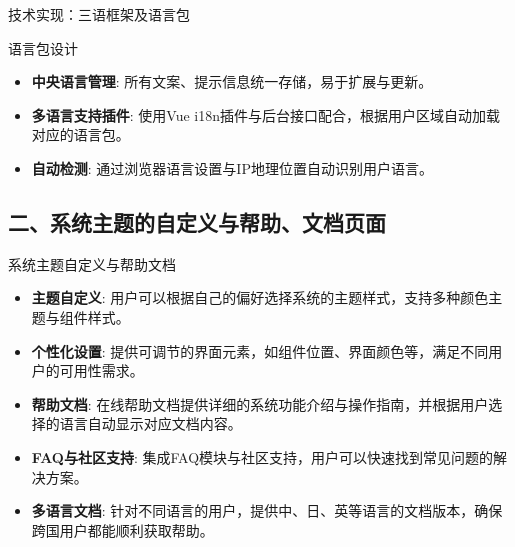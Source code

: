 \documentclass{beamer}
\begin{document}
\begin{frame}{技术实现：三语框架及语言包}
    \begin{block}{语言包设计}
        \begin{itemize}
            \item \textbf{中央语言管理}: 所有文案、提示信息统一存储，易于扩展与更新。
            \item \textbf{多语言支持插件}: 使用Vue i18n插件与后台接口配合，根据用户区域自动加载对应的语言包。
            \item \textbf{自动检测}: 通过浏览器语言设置与IP地理位置自动识别用户语言。
        \end{itemize}
    \end{block}
\end{frame}

\subsection{二、系统主题的自定义与帮助、文档页面}
\begin{frame}{系统主题自定义与帮助文档}
    \begin{itemize}
        \item \textbf{主题自定义}: 用户可以根据自己的偏好选择系统的主题样式，支持多种颜色主题与组件样式。
        \item \textbf{个性化设置}: 提供可调节的界面元素，如组件位置、界面颜色等，满足不同用户的可用性需求。
        \item \textbf{帮助文档}: 在线帮助文档提供详细的系统功能介绍与操作指南，并根据用户选择的语言自动显示对应文档内容。
        \item \textbf{FAQ与社区支持}: 集成FAQ模块与社区支持，用户可以快速找到常见问题的解决方案。
        \item \textbf{多语言文档}: 针对不同语言的用户，提供中、日、英等语言的文档版本，确保跨国用户都能顺利获取帮助。
    \end{itemize}
\end{frame}



\end{document}
